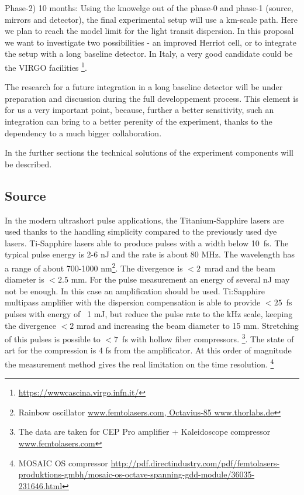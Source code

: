 \documentclass[9pt, a4, twoside]{article}
\begin{document}
Phase-2) 10 months: Using the knowelge out of the phase-0 and phase-1 (source, mirrors and detector), the final experimental setup will use a km-scale path. Here we plan to reach the model limit for the light transit dispersion. In this proposal we want to investigate two possibilities - an improved Herriot cell, or to integrate the setup with a long baseline detector. In Italy, a very good candidate could be the VIRGO facilities \footnote{\url {https://wwwcascina.virgo.infn.it/}}.

The research for a future integration in a long baseline detector will be under preparation and discussion during the full developpement process. This element is for us a very important point, because, further a better sensitivity, such an integration can bring to a better perenity of the experiment, thanks to the dependency to a much bigger collaboration.

In the further sections the technical solutions of the experiment components will be described.

\subsection {Source}

In  the modern ultrashort pulse applications, the Titanium-Sapphire lasers  are used thanks to the handling simplicity compared to the previously  used dye lasers. Ti-Sapphire lasers able to produce pulses with a width  below  10~fs. The typical pulse energy is 2-6 nJ and the rate is about 80 MHz. The wavelength has a range of about 700-1000 nm\footnote{Rainbow oscillator \url{www.femtolasers.com, Octavius-85 www.thorlabs.de}}. The  divergence  is $< 2$~mrad and the beam diameter is $< 2.5$ mm. For the pulse  measurement an energy of several nJ may not be enough. In this case an  amplification should be used. Ti:Sapphire multipass amplifier with the  dispersion compensation is able to provide $<25$~fs pulses with energy  of ~1 mJ, but reduce the pulse rate to the kHz scale, keeping the divergence $<2$ mrad  and increasing the beam diameter to 15 mm. Stretching of this pulses is  possible to $<7$~fs with hollow  fiber compressors. \footnote{The data are taken for CEP Pro amplifier + Kaleidoscope compressor \url{www.femtolasers.com}}. The state of art  for the compression is 4 fs from the amplificator. At this  order of magnitude the measurement method gives the real limitation on  the time resolution. \footnote{MOSAIC OS compressor \url{http://pdf.directindustry.com/pdf/femtolasers-produktions-gmbh/mosaic-os-octave-spanning-gdd-module/36035-231646.html}}
\end{document}
